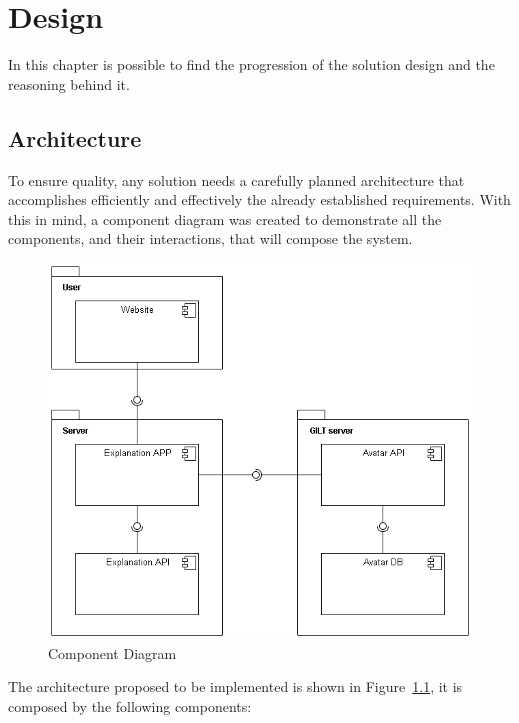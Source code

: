 
\chapter{Design} %
\label{chap:Chapter4}

In this chapter is possible to find the progression of the solution design and the reasoning behind it.

\section{Architecture}

To ensure quality, any solution needs a carefully planned architecture that accomplishes efficiently and effectively the already established requirements.
With this in mind, a component diagram was created to demonstrate all the components, and their interactions, that will compose the system.

\begin{figure}[H]
\centering
\includegraphics[scale=0.5]{ch4/assets/component_diagram.png}
\caption[Component Diagram]{Component Diagram}
\label{fig:cd}
\end{figure}

The architecture proposed to be implemented is shown in Figure~\ref{fig:cd}, it is composed by the following components:


